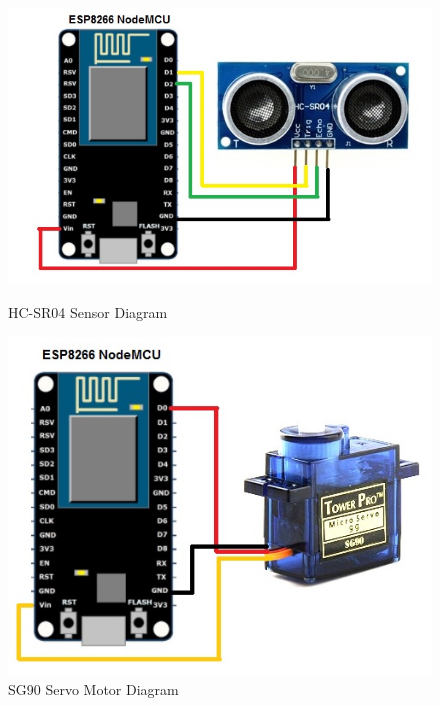 \begin{figure}[htb]
	\centering\includegraphics[width=\columnwidth]{images/Ultrasonic-sensor.jpg}
	\caption{HC-SR04 Sensor Diagram}\label{F:usensor}

	\centering\includegraphics[width=\columnwidth]{images/SG90-servo.jpg}
	\caption{SG90 Servo Motor Diagram}\label{F:sg90}


\end{figure}
